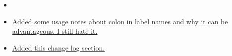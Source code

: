 \begin{itemize}
\item[]
\item \hyperref[changelog:20200823colon]{Added some usage notes about colon in label names and why it can be advantageous. I still hate it.}
\item \hyperref[section:changelog]{Added this change log section.}
\end{itemize}


